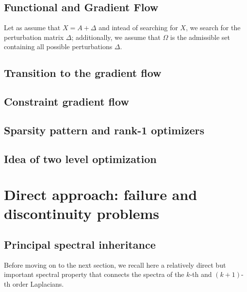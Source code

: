 \subsection{Functional and Gradient Flow}

Let as assume that \( X = A + \Delta \) and intead of searching for \( X \), we search for the perturbation matrix \( \Delta \); additionally, we assume that \( \Omega \) is the admissible set containing all possible perturbations \( \Delta \).


\subsection{ Transition to the gradient flow }
  

\subsection{ Constraint gradient flow }

\subsection{ Sparsity pattern and rank-1 optimizers }

\subsection{ Idea of two level optimization }















\section{Direct approach: failure and discontinuity problems }


\subsection{Principal spectral inheritance}


Before moving on to the next section, we recall here a relatively direct  but important spectral property that connects the spectra of the $k$-th and $(k+1)$-th order Laplacians. 


